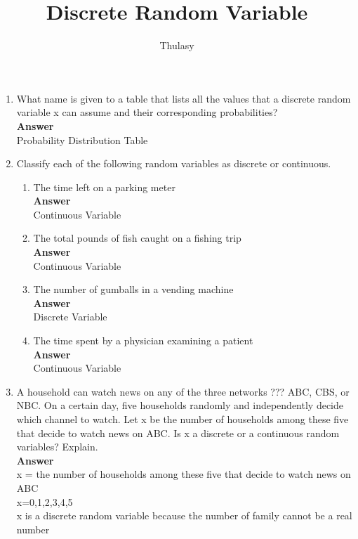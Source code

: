\documentclass{article}\usepackage[]{graphicx}\usepackage[]{xcolor}
\title{Discrete Random Variable}
\author{Thulasy}
\date{}
\begin{document}
\maketitle{}

\begin{enumerate}

\item What name is given to a table that lists all the values that a discrete random variable x can assume and their corresponding probabilities?\\
\textbf{Answer}\\
Probability Distribution Table

\item Classify each of the following random variables as discrete or continuous.\\
\begin{enumerate}
\item The time left on a parking meter\\
\textbf{Answer}\\
Continuous Variable\\
\item The total pounds of fish caught on a fishing trip\\
\textbf{Answer}\\
Continuous Variable\\
\item The number of gumballs in a vending machine\\
\textbf{Answer}\\
Discrete Variable\\
\item The time spent by a physician examining a patient\\
\textbf{Answer}\\
Continuous Variable\\
\end{enumerate}

\item A household can watch news on any of the three networks ??? ABC, CBS, or NBC. On a certain day, five households randomly and independently decide which channel to watch. Let x be the number of households among these five that decide to watch news on ABC. Is x a discrete or a continuous random variables? Explain.\\
\textbf{Answer}\\
x = the number of households among these five that decide to watch news on ABC\\
x=0,1,2,3,4,5\\
x is a discrete random variable because the number of family cannot be a real number\\


\end{enumerate}
\end{document}

